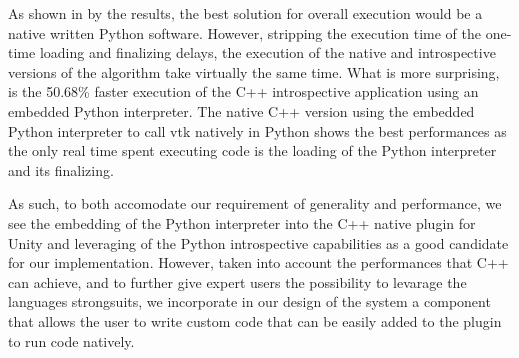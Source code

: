 As shown in by the results, the best solution for overall execution would be a native written Python software. However, stripping the execution time of the one-time loading and finalizing delays, the execution of the native and introspective versions of the algorithm take virtually the same time. What is more surprising, is the 50.68\% faster execution of the C++ introspective application using an embedded Python interpreter. The native C++ version using the embedded Python interpreter to call \acrshort{vtk} natively in Python shows the best performances as the only real time spent executing code is the loading of the Python interpreter and its finalizing.

As such, to both accomodate our requirement of generality and performance, we see the embedding of the Python interpreter into the C++ native plugin for Unity and leveraging of the Python introspective capabilities as a good candidate for our implementation. However, taken into account the performances that C++ can achieve, and to further give expert users the possibility to levarage the languages strongsuits, we incorporate in our design of the system a component that allows the user to write custom code that can be easily added to the plugin to run code natively.
